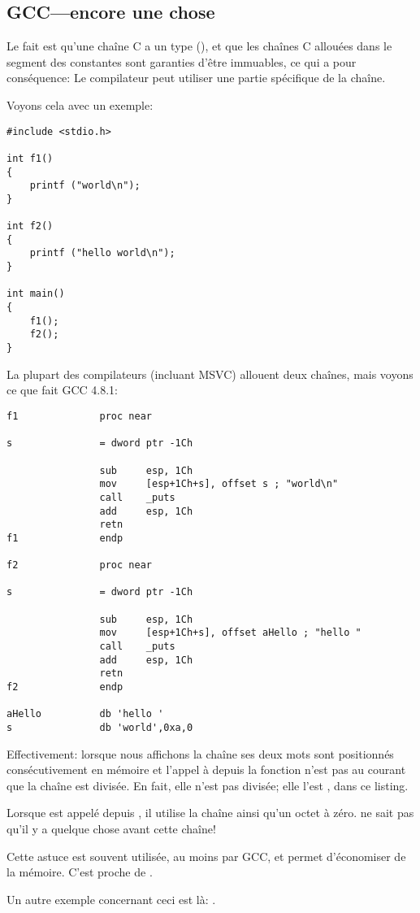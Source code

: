 ﻿\subsection{GCC---encore une chose}
\label{use_parts_of_C_strings}

Le fait est qu'une chaîne C  a un type  (),
et que les chaînes C allouées dans le segment des constantes sont garanties d'être immuables, ce qui a pour
conséquence:
Le compilateur peut utiliser une partie spécifique de la chaîne.

Voyons cela avec un exemple:

\begin{lstlisting}[style=customc]
#include <stdio.h>

int f1()
{
	printf ("world\n");
}

int f2()
{
	printf ("hello world\n");
}

int main()
{
	f1();
	f2();
}
\end{lstlisting}

La plupart des compilateurs \CCpp{} (incluant MSVC) allouent deux chaînes, mais voyons ce que fait GCC 4.8.1:

\begin{lstlisting}[caption=GCC 4.8.1 + IDA listing,style=customasmx86]
f1              proc near

s               = dword ptr -1Ch

                sub     esp, 1Ch
                mov     [esp+1Ch+s], offset s ; "world\n"
                call    _puts
                add     esp, 1Ch
                retn
f1              endp

f2              proc near

s               = dword ptr -1Ch

                sub     esp, 1Ch
                mov     [esp+1Ch+s], offset aHello ; "hello "
                call    _puts
                add     esp, 1Ch
                retn
f2              endp

aHello          db 'hello '
s               db 'world',0xa,0
\end{lstlisting}

Effectivement: lorsque nous affichons la chaîne  ses deux mots sont positionnés
consécutivement en mémoire et l'appel à \puts depuis la fonction 
n'est pas au courant que la chaîne est divisée.
En fait, elle n'est pas divisée; elle l'est , dans ce listing.

Lorsque \puts est appelé depuis , il utilise la chaîne  ainsi qu'un
octet à zéro. \puts ne sait pas qu'il y a quelque chose avant cette chaîne!

Cette astuce est souvent utilisée, au moins par GCC, et permet d'économiser de la mémoire.
C'est proche de . %

Un autre exemple concernant ceci est là: .

